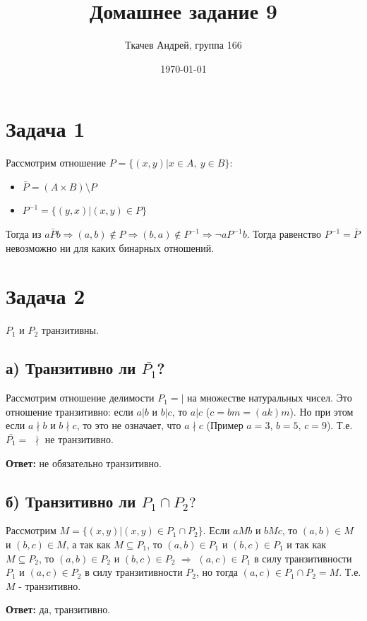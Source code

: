 \documentclass{article}
\title{Домашнее задание 9}
\author{Ткачев Андрей, группа 166}
\date{\today}
\begin{document}
	\maketitle
	\section {Задача 1}
		Рассмотрим отношение $P = \{(x, y)|x \in A, \ y \in B\}$: 
		\begin{itemize}
			\item $\bar{P} = (A \times B) \setminus P$
			\item $P^{-1} = \{(y, x)| (x, y) \in P\}$ 
		\end{itemize}
	Тогда из $a \bar{P} b \Rightarrow (a, b) \notin P \Rightarrow (b, a) \notin P^{-1} \Rightarrow \neg a P^{-1} b$. Тогда равенство $P^{-1} = \bar{P}$ невозможно ни для каких бинарных отношений.
	
	\section{Задача 2}
	$P_1$ и $P_2$ транзитивны.
	\subsection{а) Транзитивно ли $\bar{P_1}$?}
	
	Рассмотрим отношение делимости $P_1 = |$ на множестве натуральных чисел. Это отношение транзитивно: если $a | b$ и $b | c$, то $a | c$ ($c = bm = (ak)m$). Но при этом если $a \nmid b$ и $b \nmid c$, то это не означает, что $a \nmid c$ (Пример $a = 3$, $b = 5$, $c = 9$). Т.е. $\bar{P_1} =$ $\nmid$ не транзитивно.
	
	\textbf{Ответ:} не обязательно транзитивно. 
	
	\subsection{б) Транзитивно ли $P_1 \cap P_2?$}
	
	Рассмотрим $M = \{(x, y) | (x, y) \in P_1 \cap P_2\}$. Если $a M b$ и $b M c$, то  $(a, b) \in M$ и $(b, c) \in M$, а так как $M \subseteq P_1$, то $(a, b) \in P_1$ и $(b, c) \in P_1$ и так как  $M \subseteq P_2$, то $(a, b) \in P_2$ и $(b, c) \in P_2$ $\Rightarrow$ $(a, c) \in P_1$ в силу транзитивности $P_1$  и $(a, c) \in P_2$ в силу транзитивности $P_2$, но тогда $(a, c) \in P_1 \cap P_2 = M$. Т.е. $M$ - транзитивно.
	
	\textbf{Ответ:} да, транзитивно.
	
\end{document}
